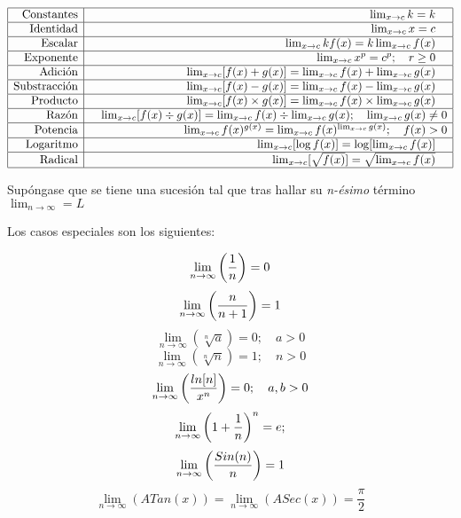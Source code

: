 \documentclass[tikz,11pt,fleqn]{book} %
\begin{document}
$$\begin{array} {|r|r|}
		\hline  \text{Constantes}
		 & \quad\lim_{x\to c}k
		=k    \quad                                        \\
		\hline  \text{Identidad}
		 & \quad\lim_{x\to c}x
		=c    \quad                                        \\
		\hline  \text{Escalar}
		 & \quad\lim_{x\to c}kf(x)
		=k\lim_{x\to c}f(x)    \quad                       \\
		\hline  \text{Exponente}
		 & \quad\lim_{x\to c}x^p
		=c^p;    \quad r\ge0\quad                          \\
		\hline  \text{Adición}
		 & \quad\lim_{x\to c}[f(x)+g(x)]
		=\lim_{x\to c}f(x)+\lim_{x\to c}g(x)    \quad      \\
		\hline  \text{Substracción}
		 & \quad\lim_{x\to c}[f(x)-g(x)]
		=\lim_{x\to c}f(x)-\lim_{x\to c}g(x)    \quad      \\
		\hline  \text{Producto}
		 & \quad\lim_{x\to c}[f(x)\times g(x)]
		=\lim_{x\to c}f(x)\times\lim_{x\to c}g(x)    \quad \\
		\hline  \text{Razón}
		 & \quad\lim_{x\to c}[f(x)\div g(x)]
		=\lim_{x\to c}f(x)\div\lim_{x\to c}g(x);
		\quad \lim_{x\to c}g(x)\ne0                        \\
		\hline  \text{Potencia}
		 & \quad\lim_{x\to c}f(x)^{g(x)}
		=\lim_{x\to c}f(x)^{\lim_{x\to c}g(x)};
		\quad f(x)>0                                       \\
		\hline  \text{Logaritmo}
		 & \quad\lim_{x\to c}[\log f(x)]
		=\log[\lim_{x\to c}f(x)]    \quad                  \\
		\hline  \text{Radical}
		 & \quad\lim_{x\to c}[\sqrt{f(x)}]
		=\sqrt{\lim_{x\to c}f(x)}    \quad                 \\
		\hline
	\end{array}$$

Supóngase que se tiene una sucesión tal que tras hallar su \textit{n-ésimo} término $\lim_{n\to\infty}=L$

Los casos especiales son los siguientes:

$$
	\lim_{n\to\infty}\left( \frac1n \right)=0
$$ $$
	\lim_{n\to\infty}\left( \frac n{n+1} \right)=1
$$ $$
	\lim_{n\to\infty}(\sqrt[n]{a})=0;\quad a>0
$$ $$
	\lim_{n\to\infty}(\sqrt[n]n)=1;\quad n>0
$$ $$
	\lim_{n\to\infty}\left( \frac{ln[n]}{x^n} \right)=0;\quad a,b>0
$$ $$
	\lim_{n\to\infty}\left( 1+\frac1n \right)^n=e;
$$ $$
	\lim_{n\to\infty}\left( \frac{Sin(n)}n \right)=1
$$ $$
	\lim_{n\to\infty}(ATan(x))=\lim_{n\to\infty}(ASec(x))=\frac{\pi}2
$$
\end{document}

